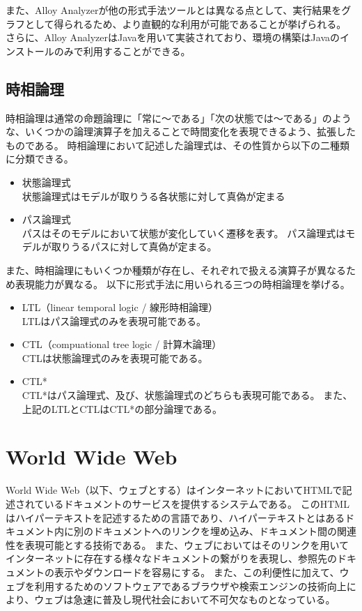 \documentclass[12pt,a4paper]{jbook}
\begin{document}
また、Alloy Analyzerが他の形式手法ツールとは異なる点として、実行結果をグラフとして得られるため、より直観的な利用が可能であることが挙げられる。
さらに、Alloy AnalyzerはJavaを用いて実装されており、環境の構築はJavaのインストールのみで利用することができる。

\subsection{時相論理}
\label{sec:TemporalLogic}
時相論理は通常の命題論理に「常に～である」「次の状態では～である」のような、いくつかの論理演算子を加えることで時間変化を表現できるよう、拡張したものである。
時相論理において記述した論理式は、その性質から以下の二種類に分類できる。
\begin{itemize}
\item 状態論理式\\
状態論理式はモデルが取りうる各状態に対して真偽が定まる
\item パス論理式\\
パスはそのモデルにおいて状態が変化していく遷移を表す。
パス論理式はモデルが取りうるパスに対して真偽が定まる。
\end{itemize}

また、時相論理にもいくつか種類が存在し、それぞれで扱える演算子が異なるため表現能力が異なる。
以下に形式手法に用いられる三つの時相論理を挙げる。
\begin{itemize}
\item LTL（linear temporal logic / 線形時相論理）\\
LTLはパス論理式のみを表現可能である。
\item CTL（compuational tree logic / 計算木論理）\\
CTLは状態論理式のみを表現可能である。
\item CTL*\\
CTL*はパス論理式、及び、状態論理式のどちらも表現可能である。
また、上記のLTLとCTLはCTL*の部分論理である。
\end{itemize}

\section{World Wide Web}
World Wide Web（以下、ウェブとする）はインターネットにおいてHTMLで記述されているドキュメントのサービスを提供するシステムである。
このHTMLはハイパーテキストを記述するための言語であり、ハイパーテキストとはあるドキュメント内に別のドキュメントへのリンクを埋め込み、ドキュメント間の関連性を表現可能とする技術である。
また、ウェブにおいてはそのリンクを用いてインターネットに存在する様々なドキュメントの繋がりを表現し、参照先のドキュメントの表示やダウンロードを容易にする。
また、この利便性に加えて、ウェブを利用するためのソフトウェアであるブラウザや検索エンジンの技術向上により、ウェブは急速に普及し現代社会において不可欠なものとなっている。
\end{document}
